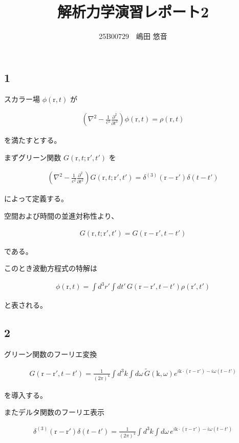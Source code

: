 \documentclass[platex,dvipdfmx,a4paper]{jsarticle}
\title{解析力学演習レポート2}
\author{25B00729　嶋田 悠音}
\newcommand{\vect}[1]{\boldsymbol{\mathrm{#1}}}
\begin{document}
\maketitle
\subsection*{1}

スカラー場 $\phi(\vect r,t)$ が

\begin{align*}
\left(
\nabla^2-\frac{1}{c^2}\frac{\partial^2}{\partial t^2}
\right)\phi(\vect r,t)
=
\rho(\vect r,t)
\end{align*}

を満たすとする。

まずグリーン関数 $G(\vect r,t;\vect r',t')$ を

\begin{align*}
\left(
\nabla^2-\frac{1}{c^2}\frac{\partial^2}{\partial t^2}
\right)
G(\vect r,t;\vect r',t')
=
\delta^{(3)}(\vect r-\vect r')
\delta(t-t')
\end{align*}

によって定義する。

空間および時間の並進対称性より、

\begin{align*}
G(\vect r,t;\vect r',t')
=
G(\vect r-\vect r',t-t')
\end{align*}

である。

このとき波動方程式の特解は

\begin{align*}
\phi(\vect r,t)
=
\int d^3r'
\int dt'\,
G(\vect r-\vect r',t-t')
\rho(\vect r',t')
\end{align*}

と表される。

\subsection*{2}

グリーン関数のフーリエ変換

\begin{align*}
G(\vect r-\vect r',t-t')
=
\frac{1}{(2\pi)^4}
\int d^3k
\int d\omega\,
\widetilde G(\vect k,\omega)
e^{i\vect k\cdot(\vect r-\vect r')-i\omega(t-t')}
\end{align*}

を導入する。

またデルタ関数のフーリエ表示

\begin{align*}
\delta^{(3)}(\vect r-\vect r')
\delta(t-t')
=
\frac{1}{(2\pi)^4}
\int d^3k
\int d\omega\,
e^{i\vect k\cdot(\vect r-\vect r')-i\omega(t-t')}
\end{align*}
\end{document}
